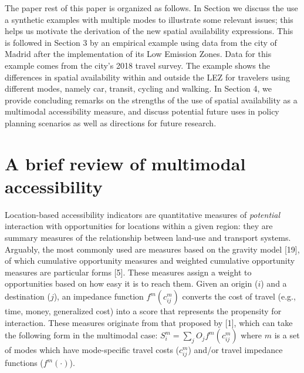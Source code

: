 \documentclass[10pt,letterpaper]{article}
\begin{document}
The paper rest of this paper is organized as follows. In Section we
discuss the use a synthetic examples with multiple modes to illustrate
some relevant issues; this helps us motivate the derivation of the new
spatial availability expressions. This is followed in Section 3 by an
empirical example using data from the city of Madrid after the
implementation of its Low Emission Zones. Data for this example comes
from the city's 2018 travel survey. The example shows the differences in
spatial availability within and outside the LEZ for travelers using
different modes, namely car, transit, cycling and walking. In Section 4,
we provide concluding remarks on the strengths of the use of spatial
availability as a multimodal accessibility measure, and discuss
potential future uses in policy planning scenarios as well as directions
for future research.

\hypertarget{a-brief-review-of-multimodal-accessibility}{%
\section{A brief review of multimodal
accessibility}\label{a-brief-review-of-multimodal-accessibility}}

Location-based accessibility indicators are quantitative measures of
\emph{potential} interaction with opportunities for locations within a
given region: they are summary measures of the relationship between
land-use and transport systems. Arguably, the most commonly used are
measures based on the gravity model {[}19{]}, of which cumulative
opportunity measures and weighted cumulative opportunity measures are
particular forms {[}5{]}. These measures assign a weight to
opportunities based on how easy it is to reach them. Given an origin
(\(i\)) and a destination (\(j\)), an impedance function
\(f^{m}(c^m_{ij})\) converts the cost of travel (e.g., time, money,
generalized cost) into a score that represents the propensity for
interaction. These measures originate from that proposed by {[}1{]},
which can take the following form in the multimodal case:
\(S_i^m = \sum_j O_j f^m(c_{ij}^m)\) where \(m\) is a set of modes which
have mode-specific travel costs (\(c_{ij}^m\)) and/or travel impedance
functions (\(f^m(\cdot)\)).
\end{document}
